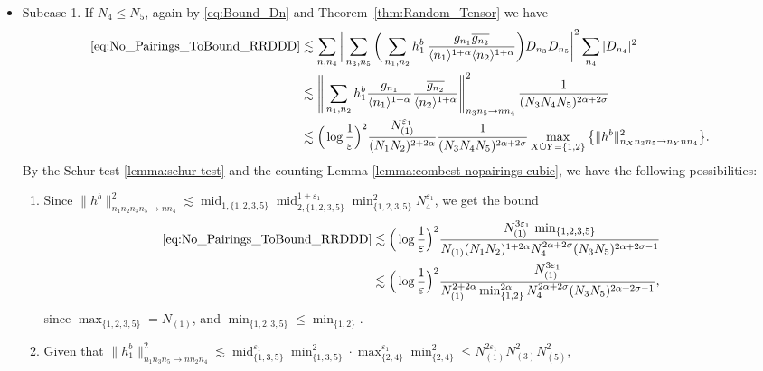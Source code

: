 \documentclass[11pt, xcolor = dvipsnames,reqno
]{amsart}
\theoremstyle{definition}
\theoremstyle{remark}
\begin{document}
\begin{itemize}
    \item Subcase 1. If $N_4 \leq N_5$,  again by \eqref{eq:Bound_Dn} and Theorem~\ref{thm:Random_Tensor} we have 
\begin{align}
    \eqref{eq:No_Pairings_ToBound_RRDDD}
    & \lesssim 
    \sum_{n,n_4} \bigg| \sum_{n_3,n_5 } \bigg( \sum_{n_1,n_2} h^b_1 \,  \frac{g_{n_1} \overline{g_{n_2}}}{\langle n_1 \rangle^{1+\alpha} \langle n_2 \rangle^{1+\alpha}} \bigg) D_{n_3}  D_{n_5} \bigg|^2
    \sum_{n_4} |D_{n_4}|^2 \\
    & \lesssim  
    \Bigg \lVert \sum_{n_1,n_2 } h^b_1 \frac{g_{n_1}}{\langle n_1 \rangle^{1+\alpha}} \frac{\overline{g_{n_2}}}{\langle n_2 \rangle^{1+\alpha}} \Bigg \rVert_{n_3n_5 \to nn_4}^2 \, \frac{1}{(N_3N_4N_5)^{2\alpha + 2\sigma}} \\
    & 
    \lesssim \Big(\log \frac{1}{\varepsilon}\Big)^2
    \frac{N_{(1)}^{\varepsilon_1}}{(N_1N_2)^{2 + 2\alpha}} \frac{1}{(N_3N_4N_5)^{2\alpha + 2\sigma}}
    \max_{X \dot{\cup} Y = \{1,2\}} \big\{
    \lVert  h^b \rVert_{n_Xn_3n_5 \to n_Ynn_4}^2
    \big\}.
\end{align}
By the Schur test \ref{lemma:schur-test} and the counting Lemma \ref{lemma:combest-nopairings-cubic}, 
we have the following possibilities:
\hfill \break
\begin{enumerate}
    \item Since
    $\lVert  h^b \rVert_{n_1n_2n_3n_5 \to nn_4}^2
    \lesssim \operatorname{mid}_{1,\{1,2,3,5\}} \operatorname{mid}_{2,\{1,2,3,5\}}^{1+\varepsilon_1} \operatorname{min}_{\{1,2,3,5\}}^2 N_4^{\varepsilon_1}$, 
    we get the bound
    \begin{align}
     \eqref{eq:No_Pairings_ToBound_RRDDD} 
     &\lesssim \Big(\log \frac{1}{\varepsilon}\Big)^2 \frac{N_{(1)}^{3\varepsilon_1} \, \min_{\{1,2,3,5\}} }{N_{(1)} (N_1N_2)^{1 + 2\alpha}N_4^{2\alpha + 2\sigma} (N_3N_5)^{2 \alpha + 2\sigma - 1}}
     \\
     &\lesssim 
     \Big(\log \frac{1}{\varepsilon}\Big)^2 \frac{N_{(1)}^{3\varepsilon_1} }{N_{(1)}^{2 + 2\alpha} \min_{\{1,2\}}^{2\alpha} N_4^{2\alpha + 2\sigma} (N_3N_5)^{2 \alpha + 2\sigma - 1}},
    \end{align} 
    since $\max_{\{1,2,3,5\}} = N_{(1)}$, and $\operatorname{min}_{\{1,2,3,5\}}\leq \operatorname{min}_{\{1,2\}}$. 
    \item Given that $\lVert  h^b_1 \rVert_{n_1n_3n_5 \to nn_2n_4}^2
    \lesssim 
    \operatorname{mid}_{\{1,3,5\}}^{\varepsilon_1} \operatorname{min}_{\{1,3,5\}}^2 \cdot \operatorname{max}_{\{2,4\}}^{\varepsilon_1} \operatorname{min}_{\{2,4\}}^2 \leq N_{(1)}^{2\varepsilon_1} N_{(3)}^2 N_{(5)}^2$,

\end{enumerate}
\end{itemize}
\end{document}
